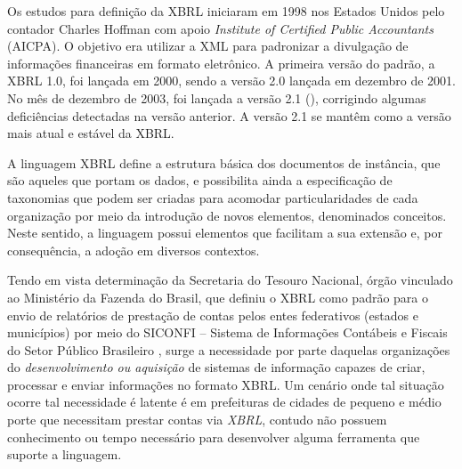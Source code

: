 \documentclass[msc,proposal,hidelot,hideabstract]{ppgccufmg} %
\begin{document}
Os estudos para definição da XBRL iniciaram em 1998 nos Estados Unidos pelo contador Charles Hoffman com apoio \textit{Institute of Certified Public Accountants} (AICPA). O objetivo era utilizar a XML para padronizar a divulgação de informações financeiras em formato eletrônico. A primeira versão do padrão, a XBRL 1.0, foi lançada em 2000, sendo a versão 2.0 lançada em dezembro de 2001. No mês de dezembro de 2003, foi lançada a versão 2.1 (\cite{hoffman_2006}), corrigindo algumas deficiências detectadas na versão anterior. A versão 2.1 se mantêm como a versão mais atual e estável da XBRL.

A linguagem XBRL define a estrutura básica dos documentos de instância, que são aqueles que portam os dados, e possibilita ainda a especificação de taxonomias que podem ser criadas para acomodar particularidades de cada organização por meio da introdução de novos elementos, denominados conceitos. Neste sentido, a linguagem possui elementos que facilitam a sua extensão e, por consequência, a adoção em diversos contextos.


Tendo em vista determinação da Secretaria do Tesouro Nacional, órgão
vinculado ao  Ministério da Fazenda do Brasil, que definiu o XBRL como
padrão para o envio de relatórios de prestação de contas pelos entes
federativos (estados e municípios) por meio do SICONFI – Sistema de Informações Contábeis e Fiscais do Setor Público Brasileiro \cite{nt_03_2013}, surge a necessidade por parte
daquelas organizações do \textit{desenvolvimento ou aquisição} de sistemas de
informação capazes de criar, processar e enviar informações no formato
XBRL. Um cenário onde tal situação ocorre tal necessidade é latente é em prefeituras de cidades de pequeno e médio porte que necessitam prestar contas via \textit{XBRL}, contudo
não possuem conhecimento ou tempo necessário para desenvolver alguma ferramenta que suporte a linguagem.
\end{document}
